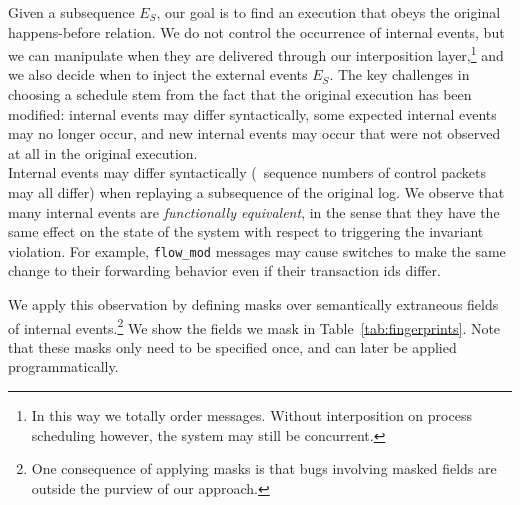 Given a subsequence $E_S$, our goal is to find an execution that obeys the
original happens-before relation. We do not control the
occurrence of internal events, but we can manipulate when they are delivered
through our interposition layer,\footnote{In this way we totally order
messages. Without interposition on process scheduling however, the
system may still be concurrent.}
and we also decide when to inject the external
events $E_S$. The key challenges in choosing a schedule stem from the fact
that the original execution has been modified: internal events may differ
syntactically, some expected internal events may no
longer occur, and new internal events may occur that were not observed at all
in the original execution.\\[0.5ex]
%
%
%
 Internal events may differ syntactically (\eg~sequence numbers
of control packets may all differ) when replaying a subsequence of the original log.
We observe that many internal events are {\em functionally
equivalent}, in the sense that they
have the same effect on the state of the system with respect to triggering the
invariant violation. For example,
\verb=flow_mod=
messages may cause switches to make the same change to their forwarding behavior
even if their transaction ids differ.

We apply this observation by defining
masks over semantically extraneous fields of
internal events.\footnote{One consequence
of applying masks is that bugs involving masked fields are outside the purview of
our approach.} We show the fields we mask in Table~\ref{tab:fingerprints}.
Note that these masks only need to be specified once, and can later be
applied programmatically.

